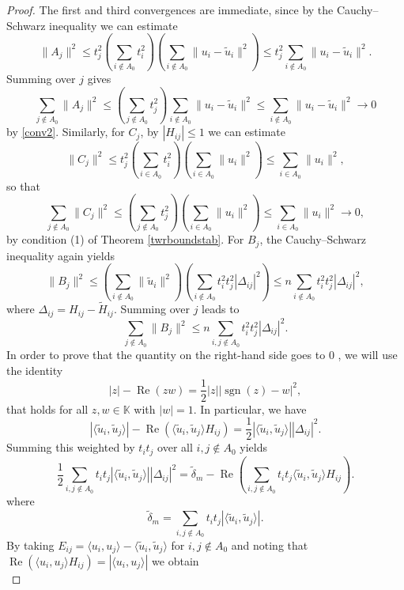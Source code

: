 \documentclass[12pt, reqno]{amsart}
\theoremstyle{definition}
\theoremstyle{remark}
\numberwithin{equation}{section}
\DeclareMathOperator{\sgn}{sgn}
\DeclareMathOperator{\re}{Re}
\begin{document}
\begin{proof}
The first and third convergences are immediate, since by the Cauchy--Schwarz inequality we can estimate 
$$\|A_j\|^2 \le t_j^2 \left(\sum_{i \notin A_0} t_i^2 \right ) \left(  \sum_{i \notin A_0} \|u_i - \widetilde{u}_i\|^2 \right ) \leq t_j^2\sum_{i \notin A_0} \|u_i - \widetilde{u}_i\|^2.$$
Summing over $j$ gives 
$$\sum_{j \not \in A_0} \|A_j\|^2 \leq \left ( \sum_{j \notin A_0} t_j^2  \right ) \sum_{i \notin A_0} \|u_i - \widetilde{u}_i\|^2 \leq \sum_{i \notin A_0} \|u_i - \widetilde{u}_i\|^2 \to 0$$
by \eqref{conv2}. Similarly, for $C_j$, by $|H_{ij}| \leq 1$ we can estimate
$$\|C_j\|^2 \leq t_j^2 \left ( \sum_{i \in A_0} t_i^2 \right )\left ( \sum_{i \in A_0} \|u_i\|^2 \right ) \leq \sum_{i \in A_0} \|u_i\|^2,$$
so that 
$$\sum_{j \notin A_0} \|C_j\|^2 \leq \left (\sum_{j \notin A_0} t_j^2 \right )\left ( \sum_{i \in A_0} \|u_i\|^2 \right ) \leq \sum_{i \in A_0} \|u_i\|^2 \to 0,$$
by condition (1) of Theorem \ref{twrboundstab}. For $B_j$, the Cauchy--Schwarz inequality again yields 
$$\|B_j\|^2 \le \left ( \sum_{i \notin A_0} \|\widetilde{u}_i\|^2 \right ) \left ( \sum_{i \notin A_0} t_i^2 t_j^2 | \Delta_{ij}|^2 \right ) \le n \sum_{i \notin A_0} t_i^2 t_j^2 |\Delta_{ij}|^2,$$
where $\Delta_{ij} = H_{ij} - \widetilde{H}_{ij}$. Summing over $j$ leads to
\begin{equation}
\label{eqbj}
\sum_{j \not\in A_0} \|B_j\|^2 \leq n \sum_{i,j \notin A_0} t_i^2 t_j^2 |\Delta_{ij}|^2.
\end{equation}
In order to prove that the quantity on the right-hand side goes to $0$ , we will use the identity
$$|z|-\re(z w) = \frac{1}{2} |z| | \sgn(z) - w|^2,$$
that holds for all $z, w \in \mathbb{K}$ with $|w|=1$. In particular, we have
$$\left | \langle \widetilde{u}_i, \widetilde{u}_j \rangle \right |- \re \left ( \langle \widetilde{u}_i, \widetilde{u}_j \rangle H_{ij} \right ) = \frac{1}{2} |\langle \widetilde{u}_i, \widetilde{u}_j \rangle| |\Delta_{ij}|^2.$$
Summing this weighted by $t_i t_j$ over all $i,j \notin A_0$ yields
$$\frac{1}{2} \sum_{i,j \notin A_0} t_i t_j |\langle \widetilde{u}_i, \widetilde{u}_j \rangle| |\Delta_{ij}|^2 = \widetilde{\delta}_m - \re \left ( \sum_{i,j \notin A_0} t_i t_j \langle \widetilde{u}_i, \widetilde{u}_j \rangle H_{ij} \right ).$$
where
$$\widetilde{\delta}_m = \sum_{i,j \notin A_0} t_i t_j |\langle \widetilde{u}_i, \widetilde{u}_j \rangle|.$$
By taking $E_{ij} = \langle u_i, u_j \rangle - \langle \widetilde{u}_i, \widetilde{u}_j \rangle $ for $i, j \notin A_0$ and noting that $\re(\langle u_i, u_j \rangle H_{ij}) = |\langle u_i, u_j \rangle |$ we obtain
\begin{equation}

\end{equation}
\end{proof}
\end{document}
